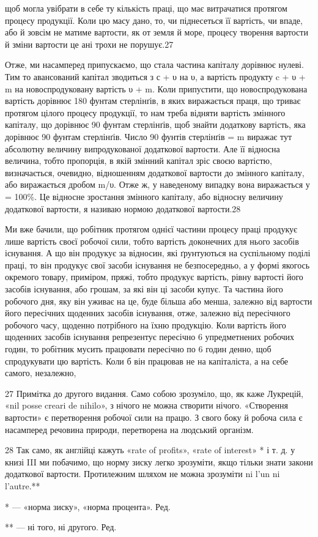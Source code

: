 щоб могла увібрати в себе ту кількість праці, що має витрачатися протягом процесу продукції. Коли цю
масу дано, то, чи піднесеться її вартість, чи впаде, або й зовсім не матиме вартости, як от земля й
море, процесу творення вартости й зміни вартости це ані трохи не порушує.27

Отже, ми насамперед припускаємо, що стала частина капіталу дорівнює нулеві. Тим то авансований
капітал зводиться з с + υ на υ, а вартість продукту c + υ + m на новоспродуковану вартість υ + m.
Коли припустити, що новоспродукована вартість дорівнює 180 фунтам стерлінґів, в яких виражається
праця, що триває протягом цілого процесу продукції, то нам треба відняти вартість змінного капіталу,
що дорівнює 90 фунтам стерлінґів, щоб знайти
додаткову вартість, яка дорівнює 90 фунтам стерлінґів. Число 90 фунтів стерлінґів = m виражає тут
абсолютну величину випродукованої додаткової вартости. Але її відносна величина, тобто пропорція, в
якій змінний капітал зріс своєю вартістю, визначається, очевидно, відношенням додаткової вартости до
змінного капіталу, або виражається дробом m/υ. Отже ж, у наведеному випадку вона виражається у 
= 100\%. Це відносне зростання
змінного капіталу, або відносну величину додаткової вартости, я називаю нормою додаткової
вартости.28

Ми вже бачили, що робітник протягом однієї частини процесу праці продукує лише вартість своєї
робочої сили, тобто вартість доконечних для нього засобів існування. А що він продукує за відносин,
які ґрунтуються на суспільному поділі праці, то він продукує свої засоби існування не безпосередньо,
а у формі якогось окремого товару, приміром, пряжі, тобто продукує вартість, рівну вартості його
засобів існування, або грошам, за які
він ці засоби купує. Та частина його робочого дня, яку він уживає на це, буде більша або менша,
залежно від вартости його пересічних щоденних засобів існування, отже, залежно від пересічного
робочого часу, щоденно потрібного на їхню продукцію. Коли вартість його щоденних засобів існування
репрезентує пересічно
6 упредметнених робочих годин, то робітник мусить працювати пересічно по 6 годин денно, щоб
спродукувати цю вартість. Коли б він працював не на капіталіста, а на себе самого, незалежно,

27    Примітка до другого видання. Само собою зрозуміло, що, як каже Лукрецій, «nil posse creari de
nihilo», з нічого не можна створити нічого. «Створення вартости» є перетворення робочої сили на
працю. З свого боку й робоча сила є насамперед речовина природи, перетворена на людський організм.

28    Так само, як англійці кажуть «rate of profits», «rate of interest» * і т. д. у книзі III ми
побачимо, що норму зиску легко зрозуміти, якщо тільки знати закони додаткової вартости. Протилежним
шляхом не можна зрозуміти ni l’un ni l’autre.**

* — «норма зиску», «норма процента». Ред.

** — ні того, ні другого. Ред.
